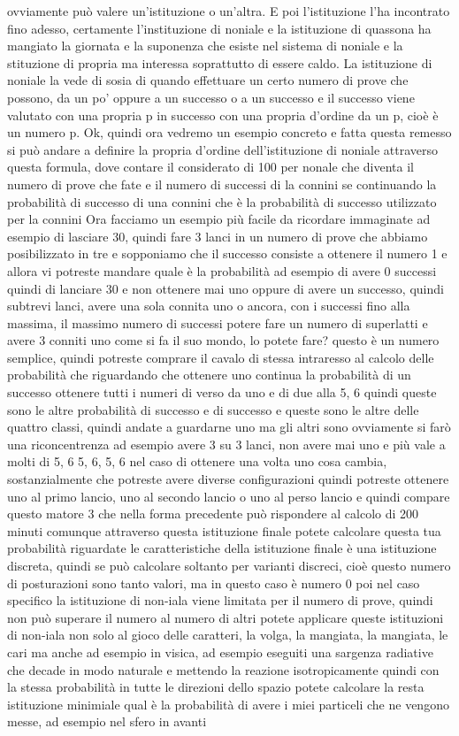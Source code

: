 ovviamente può valere un'istituzione o un'altra. E poi l'istituzione l'ha incontrato fino adesso, certamente l'instituzione di noniale e la istituzione di quassona ha mangiato la giornata e la suponenza che esiste nel sistema di noniale e la stituzione di propria ma interessa soprattutto di essere caldo. La istituzione di noniale la vede di sosia di quando effettuare un certo numero di prove che possono, da un po' oppure a un successo o a un successo e il successo viene valutato con una propria p in successo con una propria d'ordine da un p, cioè è un numero p. Ok, quindi ora vedremo un esempio concreto e fatta questa remesso si può andare a definire la propria d'ordine dell'istituzione di noniale attraverso questa formula, dove contare il considerato di 100 per nonale che diventa il numero di prove che fate e il numero di successi di la connini se continuando la probabilità di successo di una connini che è la probabilità di successo utilizzato per la connini Ora facciamo un esempio più facile da ricordare immaginate ad esempio di lasciare 30, quindi fare 3 lanci in un numero di prove che abbiamo posibilizzato in tre e sopponiamo che il successo consiste a ottenere il numero 1 e allora vi potreste mandare quale è la probabilità ad esempio di avere 0 successi quindi di lanciare 30 e non ottenere mai uno oppure di avere un successo, quindi subtrevi lanci, avere una sola connita uno o ancora, con i successi fino alla massima, il massimo numero di successi potere fare un numero di superlatti e avere 3 conniti uno come si fa il suo mondo, lo potete fare? questo è un numero semplice, quindi potreste comprare il cavalo di stessa intraresso al calcolo delle probabilità che riguardando che ottenere uno continua la probabilità di un successo ottenere tutti i numeri di verso da uno e di due alla 5, 6 quindi queste sono le altre probabilità di successo e di successo e queste sono le altre delle quattro classi, quindi andate a guardarne uno ma gli altri sono ovviamente si farò una riconcentrenza ad esempio avere 3 su 3 lanci, non avere mai uno e più vale a molti di 5, 6 5, 6, 5, 6 nel caso di ottenere una volta uno cosa cambia, sostanzialmente che potreste avere diverse configurazioni quindi potreste ottenere uno al primo lancio, uno al secondo lancio o uno al perso lancio e quindi compare questo matore 3 che nella forma precedente può rispondere al calcolo di 200 minuti comunque attraverso questa istituzione finale potete calcolare questa tua probabilità riguardate le caratteristiche della istituzione finale è una istituzione discreta, quindi se può calcolare soltanto per varianti discreci, cioè questo numero di posturazioni sono tanto valori, ma in questo caso è numero 0 poi nel caso specifico la istituzione di non-iala viene limitata per il numero di prove, quindi non può superare il numero al numero di altri potete applicare queste istituzioni di non-iala non solo al gioco delle caratteri, la volga, la mangiata, la mangiata, le cari ma anche ad esempio in visica, ad esempio eseguiti una sargenza radiative che decade in modo naturale e mettendo la reazione isotropicamente quindi con la stessa probabilità in tutte le direzioni dello spazio potete calcolare la resta istituzione minimiale qual è la probabilità di avere i miei particeli che ne vengono messe, ad esempio nel sfero in avanti 